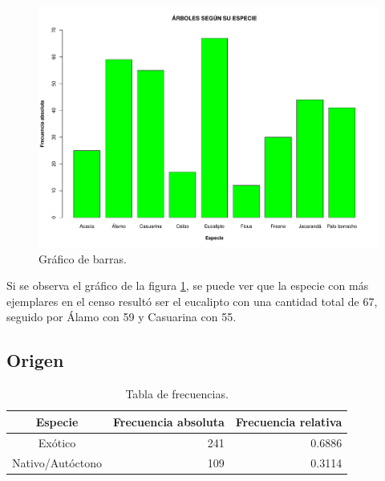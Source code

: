 \documentclass[11pt]{article}
\begin{document}
\begin{figure}[h!]
  \begin{center}
    \includegraphics[width=0.9\linewidth]{barrasEspecie.pdf}
    \caption{Gráfico de barras.}
    \label{fig:barrasEspecie}
  \end{center}  
\end{figure}

\begin{justify}
  Si se observa el gráfico de la figura \ref{fig:barrasEspecie},
  se puede ver que la especie con más ejemplares en el censo resultó
  ser el eucalipto con una cantidad total de 67, seguido por Álamo
  con 59 y Casuarina con 55.
\end{justify}


\newpage
\subsection{Origen}

\begin{table}[h!]
  \begin{center}
    \begin{tabular}{| c | r | r |}
      \hline
      \textbf{Especie} & \textbf{Frecuencia absoluta} & \textbf{Frecuencia relativa} \\ \hline
      Exótico	& 241	& 0.6886 \\ \hline
      Nativo/Autóctono & 109 & 0.3114 \\ \hline
    \end{tabular}
    \caption{Tabla de frecuencias.}
    \label{tab:tablaOrigen}
  \end{center}
\end{table}
\end{document}
